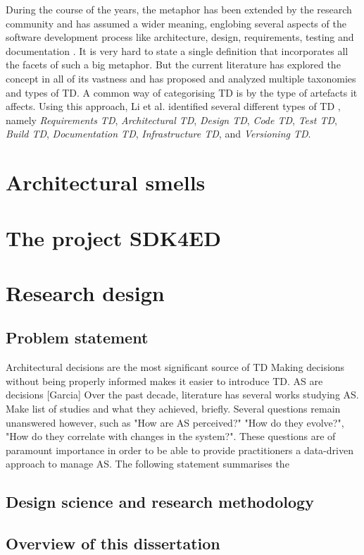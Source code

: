 During the course of the years, the metaphor has been extended by the research community and has assumed a wider meaning, englobing several aspects of the software development process like architecture, design, requirements, testing and documentation \cite{brown_managing_2010}.
It is very hard to state a single definition that incorporates all the facets of such a big metaphor. 
But the current literature has explored the concept in all of its vastness and has proposed and analyzed multiple taxonomies and types of TD.
A common way of categorising TD is by the type of artefacts it affects. Using this approach, Li et al. identified several different types of TD \cite{li_systematic_2015}, namely \emph{Requirements TD}, \emph{Architectural TD}, \emph{Design TD}, \emph{Code TD}, \emph{Test TD}, \emph{Build TD}, \emph{Documentation TD}, \emph{Infrastructure TD}, and \emph{Versioning TD}.



\section{Architectural smells}

\section{The project SDK4ED}

\section{Research design}
\subsection{Problem statement}
Architectural decisions are the most significant source of TD
Making decisions without being properly informed makes it easier to introduce TD.
AS are decisions [Garcia]
Over the past decade, literature has several works studying AS. Make list of studies and what they achieved, briefly.
Several questions remain unanswered however, such as "How are AS perceived?" "How do they evolve?", "How do they correlate with changes in the system?".
These questions are of paramount importance in order to be able to provide practitioners a data-driven approach to manage AS.
The following statement summarises the 

\subsection{Design science and research methodology}
\subsection{Overview of this dissertation}

